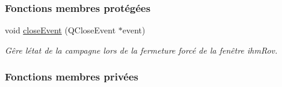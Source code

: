 \subsubsection*{Fonctions membres protégées}
\begin{DoxyCompactItemize}
\item 
void \hyperlink{class_i_h_m_rov_a68b11818797a6444a8fab81b7b45f670}{close\+Event} (Q\+Close\+Event $\ast$event)
\begin{DoxyCompactList}\small\item\em Gêre l\textquotesingle{}état de la campagne lors de la fermeture forcé de la fenêtre ihm\+Rov. \end{DoxyCompactList}\end{DoxyCompactItemize}
\subsubsection*{Fonctions membres privées}
